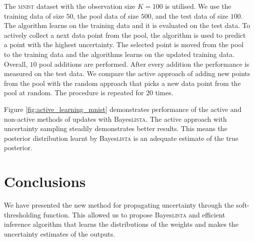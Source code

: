\documentclass{article}
\begin{document}
 The \textsc{mnist} dataset with the observation size $K=100$ is utilised. We use the training data of size $50$, the pool data of size $500$,  and the test data of size $100$. The algorithm learns on the training data and it is evaluated on the test data. To actively collect a next data point from the pool, the algorithm is used to predict a point with the highest uncertainty. The selected point is moved from the pool to the training data and the algorithms learns on the updated training data. Overall, $10$ pool additions are performed. After every addition the performance is measured on the test data. We compare the active approach of adding new points from the pool with the random approach that picks a new data point from the pool at random. The procedure is repeated for $20$ times.
  
  Figure \ref{fig:active_learning_mnist} demonstrates performance of the active and non-active methods of updates with Bayes\textsc{lista}. The active approach with uncertainty sampling steadily demonstrates better results. This means the posterior distribution learnt by Bayes\textsc{lista} is an adequate estimate of the true posterior.
  
  \section{Conclusions}
  \label{sec:conclusions}
  We have presented the new method for propagating uncertainty through the soft-thresholding function.
  This allowed us to propose Bayes\textsc{lista} and efficient inference algorithm that learns the distributions of the weights and makes the uncertainty estimates of the outputs. %
  
\end{document}
